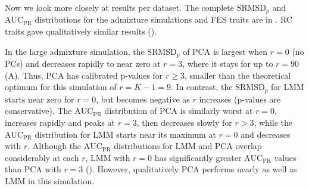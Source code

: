 \documentclass[9pt,lineno]{elife}
\newcommand{\rmsd}{\text{SRMSD}_p}
\newcommand{\auc}{\text{AUC}_\text{PR}}
\begin{document}
\begin{figure}
\begin{fullwidth}
    \label{figsupp:rmsd-auc-sim-fes-env}
    \label{figsupp:rmsd-auc-sim-rc-env}
  \end{fullwidth}
\end{figure}

Now we look more closely at results per dataset.
The complete $\rmsd$ and $\auc$ distributions for the admixture simulations and FES traits are in .
RC traits gave qualitatively similar results ().

In the large admixture simulation, the $\rmsd$ of PCA is largest when $r=0$ (no PCs) and decreases rapidly to near zero at $r=3$, where it stays for up to $r=90$ (A).
Thus, PCA has calibrated p-values for $r \ge 3$, smaller than the theoretical optimum for this simulation of $r = K - 1 = 9$.
In contrast, the $\rmsd$ for LMM starts near zero for $r=0$, but becomes negative as $r$ increases (p-values are conservative).
The $\auc$ distribution of PCA is similarly worst at $r=0$, increases rapidly and peaks at $r = 3$, then decreases slowly for $r > 3$, while the $\auc$ distribution for LMM starts near its maximum at $r=0$ and decreases with $r$.
Although the $\auc$ distributions for LMM and PCA overlap considerably at each $r$, LMM with $r=0$ has significantly greater $\auc$ values than PCA with $r=3$ ().
However, qualitatively PCA performs nearly as well as LMM in this simulation.
\end{document}
